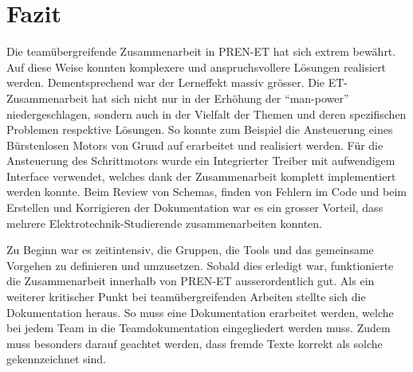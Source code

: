 \section{Fazit}
    Die teamübergreifende Zusammenarbeit in PREN-ET hat sich extrem bewährt. 
    Auf diese Weise konnten komplexere und anspruchsvollere Lösungen 
    realisiert werden. Dementsprechend war der Lerneffekt massiv grösser. Die 
    ET-Zusammenarbeit hat sich nicht nur in der Erhöhung der 
    \enquote{man-power} niedergeschlagen, sondern auch in der Vielfalt der 
    Themen und deren spezifischen Problemen respektive Lösungen. So konnte zum 
    Beispiel die Ansteuerung eines Bürstenlosen Motors von Grund auf 
    erarbeitet und realisiert werden. Für die Ansteuerung des Schrittmotors 
    wurde ein Integrierter Treiber mit aufwendigem Interface verwendet, 
    welches dank der Zusammenarbeit komplett implementiert werden konnte. Beim 
    Review von Schemas, finden von Fehlern im Code und beim Erstellen und 
    Korrigieren der Dokumentation war es ein grosser Vorteil, dass mehrere 
    Elektrotechnik-Studierende zusammenarbeiten konnten. 
    
    \noindent
    Zu Beginn war es zeitintensiv, die Gruppen, die Tools und das gemeinsame 
    Vorgehen zu definieren und umzusetzen. Sobald dies erledigt war, 
    funktionierte die Zusammenarbeit innerhalb von PREN-ET ausserordentlich 
    gut. Als ein weiterer kritischer Punkt bei teamübergreifenden Arbeiten 
    stellte sich die Dokumentation heraus. So muss eine Dokumentation 
    erarbeitet werden, welche bei jedem Team in die Teamdokumentation 
    eingegliedert werden muss. Zudem muss besonders darauf geachtet werden, 
    dass fremde Texte korrekt als solche gekennzeichnet sind. 

